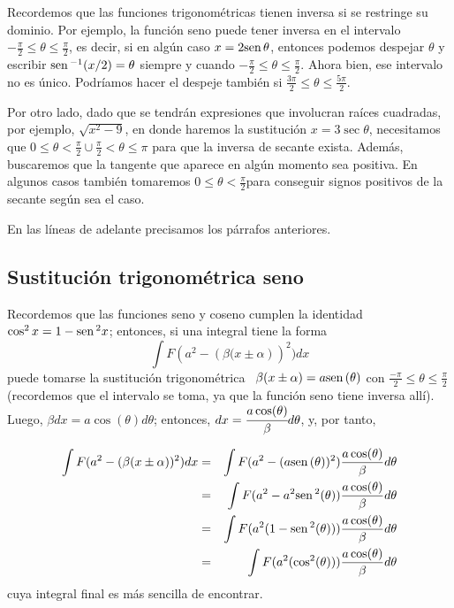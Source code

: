 Recordemos que las funciones trigonométricas tienen inversa si se restringe su dominio. Por ejemplo, la función seno puede tener inversa en el intervalo $-\frac{\pi}{2}\leq\theta\leq\frac{\pi}{2}$, es decir, si en algún caso $x=2\text{\rm sen}\, \theta$, entonces podemos despejar $\theta$ y escribir $\text{\rm sen}\,^{-1}(x/2)=\theta$ siempre y cuando $-\frac{\pi}{2}\leq\theta\leq\frac{\pi}{2}$. Ahora bien, ese intervalo no es único. Podríamos hacer el despeje también si $\frac{3\pi}{2}\leq\theta\leq\frac{5\pi}{2}$.


Por otro lado, dado que se tendrán expresiones que involucran raíces cuadradas, por ejemplo, $\sqrt{x^2-9}$, en donde haremos la sustitución $x=3\sec\theta$, necesitamos que $0\leq\theta<\frac{\pi}{2}\cup \frac{\pi}{2}<\theta\leq\pi$ para que la inversa de secante exista. Además, buscaremos que la tangente que aparece en algún momento sea positiva. En algunos casos también tomaremos $0\leq\theta<\frac{\pi}{2}$para conseguir signos positivos de la secante según sea el caso.

En las líneas de adelante precisamos los párrafos anteriores.

\subsection*{Sustitución trigonométrica seno}

Recordemos que las funciones seno y coseno cumplen la identidad $\cos^2x=1-\text{\rm sen}\,^2x$; entonces, si una integral tiene la forma
\[
\int F(a^{2}-\left( \beta(x\pm \alpha\right) )^{2})dx
\]
puede tomarse la sustitución trigonométrica \ $\beta(x\pm \alpha)=a\text{\rm sen}\,
(\theta )$ con $\frac{-\pi }{2}\leq \theta \leq \frac{\pi }{2}$ (recordemos que el intervalo se toma, ya que la
función seno tiene inversa allí). Luego, $\beta dx=a\cos (\theta )d\theta$; entonces, $dx=\cfrac{a\cos (\theta )}{\beta}%
d\theta $, y, por tanto, \

\begin{eqnarray*}
\int F(a^{2}-\left( \beta(x\pm \alpha\right) )^{2})dx &=&\int F(a^{2}-(a\text{\rm sen}\,
(\theta ))^{2})\frac{a\cos (\theta )}{\beta}d\theta \\
&=&\int F(a^{2}-a^{2}\text{\rm sen}\, ^{2}(\theta ))\frac{a\cos (\theta )}{\beta}d\theta
\\
&=&\int F(a^{2}(1-\text{\rm sen}\, ^{2}(\theta )))\frac{a\cos (\theta )}{\beta}d\theta \\
&=&\int F(a^{2}(\cos ^{2}(\theta )))\frac{a\cos (\theta )}{\beta}d\theta
\end{eqnarray*}
cuya integral final es más sencilla de encontrar.

